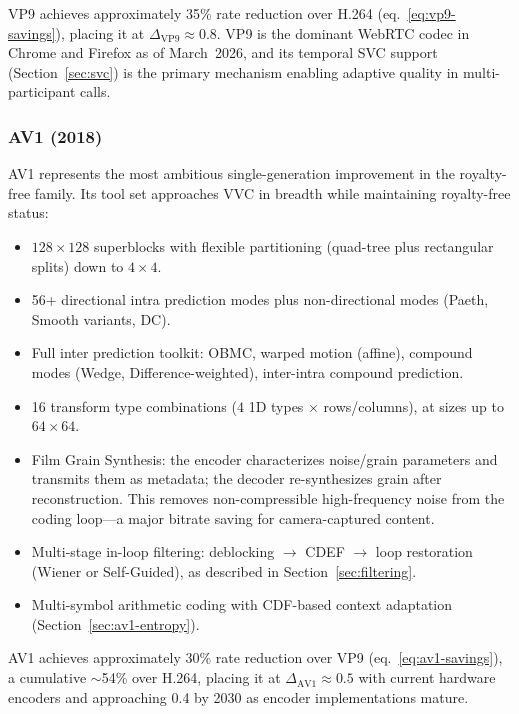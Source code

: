 VP9 achieves approximately 35\% rate reduction over H.264
(eq.~\ref{eq:vp9-savings}), placing it at $\Delta_{\text{VP9}} \approx 0.8$.
VP9 is the dominant WebRTC codec in Chrome and Firefox as of March~2026,
and its temporal SVC support (Section~\ref{sec:svc}) is the primary
mechanism enabling adaptive quality in multi-participant calls.

\subsubsection{AV1 (2018)}
\label{sec:av1}

AV1 represents the most ambitious single-generation improvement in the
royalty-free family. Its tool set approaches VVC in breadth while
maintaining royalty-free status:

\begin{itemize}
\item $128\!\times\!128$ superblocks with flexible partitioning (quad-tree
  plus rectangular splits) down to $4\!\times\!4$.

\item 56+ directional intra prediction modes plus non-directional modes
  (Paeth, Smooth variants, DC).

\item Full inter prediction toolkit: OBMC, warped motion (affine),
  compound modes (Wedge, Difference-weighted), inter-intra compound
  prediction.

\item 16 transform type combinations ($4$ 1D types $\times$ rows/columns),
  at sizes up to $64\!\times\!64$.

\item Film Grain Synthesis: the encoder characterizes noise/grain
  parameters and transmits them as metadata; the decoder re-synthesizes
  grain after reconstruction. This removes non-compressible high-frequency
  noise from the coding loop---a major bitrate saving for camera-captured
  content.

\item Multi-stage in-loop filtering: deblocking $\to$ CDEF $\to$ loop
  restoration (Wiener or Self-Guided), as described in
  Section~\ref{sec:filtering}.

\item Multi-symbol arithmetic coding with CDF-based context adaptation
  (Section~\ref{sec:av1-entropy}).
\end{itemize}

AV1 achieves approximately 30\% rate reduction over VP9
(eq.~\ref{eq:av1-savings}), a cumulative ${\sim}$54\% over H.264, placing
it at $\Delta_{\text{AV1}} \approx 0.5$ with current hardware encoders and
approaching 0.4 by 2030 as encoder implementations mature.

